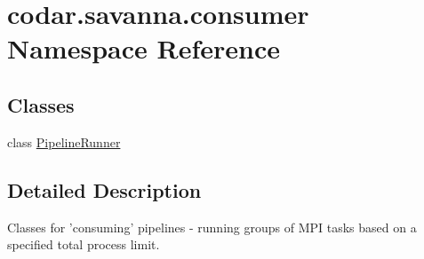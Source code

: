 \hypertarget{namespacecodar_1_1savanna_1_1consumer}{}\section{codar.\+savanna.\+consumer Namespace Reference}
\label{namespacecodar_1_1savanna_1_1consumer}
\subsection*{Classes}
\begin{DoxyCompactItemize}
\item 
class \hyperlink{classcodar_1_1savanna_1_1consumer_1_1_pipeline_runner}{Pipeline\+Runner}
\end{DoxyCompactItemize}


\subsection{Detailed Description}
\begin{DoxyVerb}Classes for 'consuming' pipelines - running groups of MPI tasks based on a
specified total process limit.\end{DoxyVerb}
 